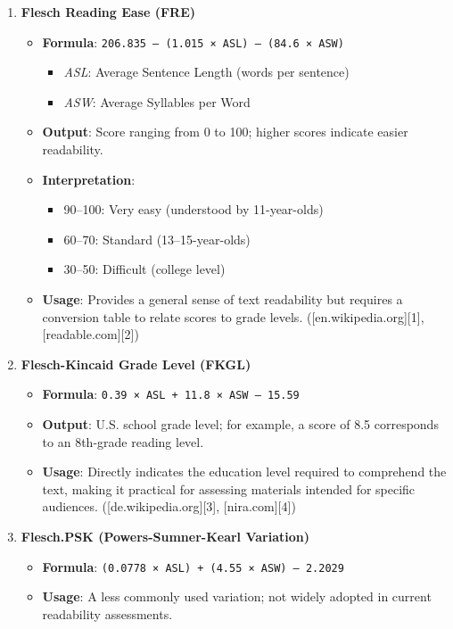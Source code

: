 \documentclass[
  11pt]{report}
\providecommand{\tightlist}{%
  \setlength{\itemsep}{0pt}\setlength{\parskip}{0pt}}\usepackage{longtable,booktabs,array}
\begin{document}
\begin{enumerate}
\def\labelenumi{\arabic{enumi}.}
\item
  \textbf{Flesch Reading Ease (FRE)}

  \begin{itemize}
  \item
    \textbf{Formula}:
    \texttt{206.835\ –\ (1.015\ ×\ ASL)\ –\ (84.6\ ×\ ASW)}

    \begin{itemize}
    \tightlist
    \item
      \emph{ASL}: Average Sentence Length (words per sentence)
    \item
      \emph{ASW}: Average Syllables per Word
    \end{itemize}
  \item
    \textbf{Output}: Score ranging from 0 to 100; higher scores indicate
    easier readability.
  \item
    \textbf{Interpretation}:

    \begin{itemize}
    \tightlist
    \item
      90--100: Very easy (understood by 11-year-olds)
    \item
      60--70: Standard (13--15-year-olds)
    \item
      30--50: Difficult (college level)
    \end{itemize}
  \item
    \textbf{Usage}: Provides a general sense of text readability but
    requires a conversion table to relate scores to grade levels.
    ({[}en.wikipedia.org{]}{[}1{]}, {[}readable.com{]}{[}2{]})
  \end{itemize}
\item
  \textbf{Flesch-Kincaid Grade Level (FKGL)}

  \begin{itemize}
  \tightlist
  \item
    \textbf{Formula}: \texttt{0.39\ ×\ ASL\ +\ 11.8\ ×\ ASW\ –\ 15.59}
  \item
    \textbf{Output}: U.S. school grade level; for example, a score of
    8.5 corresponds to an 8th-grade reading level.
  \item
    \textbf{Usage}: Directly indicates the education level required to
    comprehend the text, making it practical for assessing materials
    intended for specific audiences. ({[}de.wikipedia.org{]}{[}3{]},
    {[}nira.com{]}{[}4{]})
  \end{itemize}
\item
  \textbf{Flesch.PSK (Powers-Sumner-Kearl Variation)}

  \begin{itemize}
  \tightlist
  \item
    \textbf{Formula}:
    \texttt{(0.0778\ ×\ ASL)\ +\ (4.55\ ×\ ASW)\ –\ 2.2029}
  \item
    \textbf{Usage}: A less commonly used variation; not widely adopted
    in current readability assessments.
  \end{itemize}
\end{enumerate}
\end{document}
